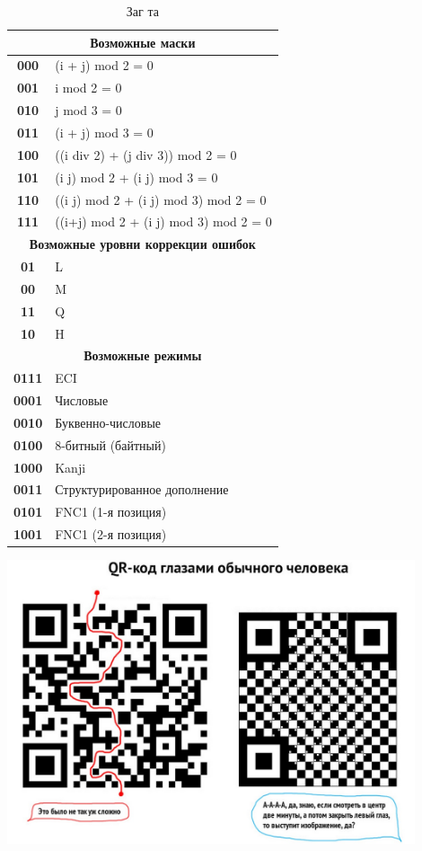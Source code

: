 \documentclass[final,pdftex]{../../template/epsilonj}
\begin{document}
\begin{table}[hbtp]
\centering
\begin{tabular}{||c|l||}
\hline 
\multicolumn{2}{|c|}{\bf Возможные маски}\\ 
\hline
{\bf 000} & (i + j) mod 2 = 0\\
{\bf 001} & i mod 2 = 0\\
{\bf 010}	& j mod 3 = 0\\
{\bf 011}	& (i + j) mod 3 = 0\\
{\bf 100}	& ((i div 2) + (j div 3)) mod 2 = 0\\
{\bf 101}	& (i j) mod 2 + (i j) mod 3 = 0\\
{\bf 110}	& ((i j) mod 2 + (i j) mod 3) mod 2 = 0\\
{\bf 111}	& ((i+j) mod 2 + (i j) mod 3) mod 2 = 0\\
\hline 
\multicolumn{2}{|c|}{\bf Возможные уровни коррекции ошибок}\\  
\hline
{\bf  01} & L\\
{\bf  00} & M\\
{\bf  11} & Q\\
{\bf  10} & H\\
\hline
\multicolumn{2}{|c|}{\bf Возможные режимы}\\  
\hline
{\bf  0111} & ECI\\
{\bf  0001} & Числовые\\
{\bf  0010} & Буквенно-числовые\\
{\bf  0100} & 8-битный (байтный)\\
{\bf  1000} & Kanji\\
{\bf  0011} & Структурированное дополнение\\
{\bf  0101} & FNC1 (1-я позиция)\\
{\bf  1001} & FNC1 (2-я позиция)\\
\hline
\end{tabular}
\caption{Заг та} \label{tab:un5} 
\end{table}

\begin{center}
\includegraphics[width=120mm]{qr.jpg} 
\end{center}

\printbibliography
\end{document}
